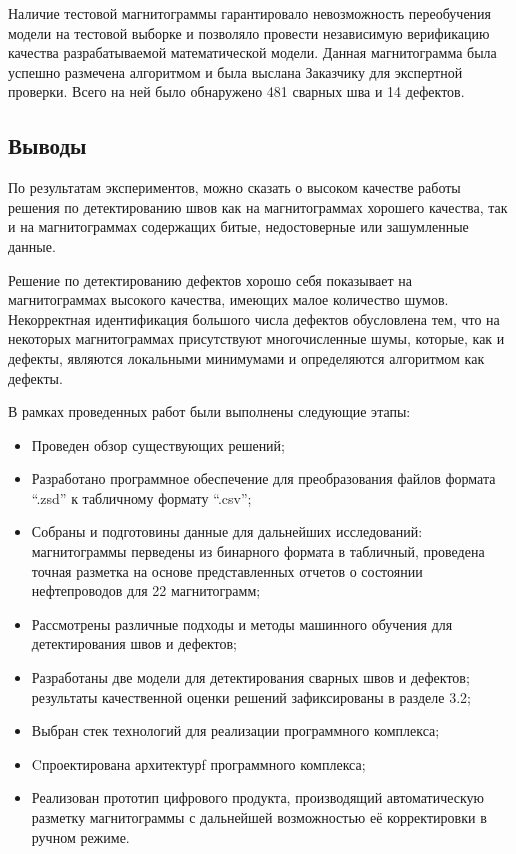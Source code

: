 \documentclass[a4paper,article,14pt]{extarticle}
\begin{document}
Наличие тестовой магнитограммы гарантировало невозможность переобучения модели на тестовой выборке 
и позволяло провести независимую верификацию качества разрабатываемой математической модели. 
Данная магнитограмма была успешно размечена алгоритмом и была выслана Заказчику для экспертной 
проверки. Всего на ней было обнаружено 481 сварных шва и 14 дефектов.

\subsection{Выводы}

По результатам экспериментов, можно сказать о высоком качестве работы решения по детектированию швов 
как на магнитограммах хорошего качества, так и на магнитограммах содержащих битые, недостоверные или 
зашумленные данные.

Решение по детектированию дефектов хорошо себя показывает на магнитограммах высокого качества, 
имеющих малое количество шумов.  Некорректная идентификация большого числа дефектов обусловлена 
тем, что на некоторых магнитограммах присутствуют многочисленные шумы, которые, как и дефекты, 
являются локальными минимумами и определяются алгоритмом как дефекты.


\pagebreak
{}

В рамках проведенных работ были выполнены следующие этапы:

\begin{itemize}
    \item Проведен обзор существующих решений;
    \item Разработано программное обеспечение для преобразования файлов формата “.zsd” к табличному формату “.csv”;
    \item Собраны и подготовины данные для дальнейших исследований: магнитограммы перведены из бинарного формата в табличный, проведена точная разметка на основе представленных отчетов о состоянии нефтепроводов для 22 магнитограмм;
    \item Рассмотрены различные подходы и методы машинного обучения для детектирования швов и дефектов;
    \item Разработаны две модели для детектирования сварных швов и дефектов; результаты качественной оценки решений зафиксированы в разделе 3.2; 
    \item Выбран стек технологий для реализации программного комплекса;
    \item Cпроектирована архитектурf программного комплекса;
    \item Реализован прототип цифрового продукта, производящий автоматическую разметку магнитограммы с дальнейшей возможностью её корректировки в ручном режиме.

\end{itemize}
\end{document}
